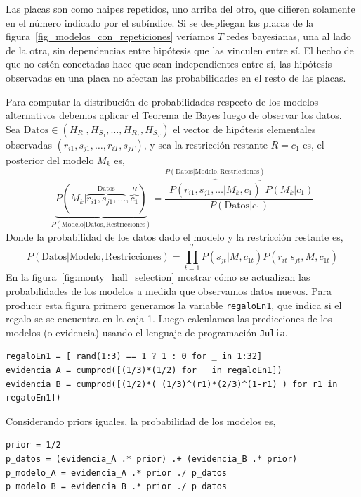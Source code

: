 \documentclass[a4paper,11pt]{book}
\theoremstyle{definition}
\begin{document}
%
Las placas son como naipes repetidos, uno arriba del otro, que difieren solamente en el n\'umero indicado por el sub\'indice.
%
Si se despliegan las placas de la figura~\ref{fig_modelos_con_repeticiones} ver\'iamos $T$ redes bayesianas, una al lado de la otra, sin dependencias entre hip\'otesis que las vinculen entre s\'i.
%
El hecho de que no est\'en conectadas hace que sean independientes entre s\'i, las hip\'otesis observadas en una placa no afectan las probabilidades en el resto de las placas.


Para computar la distribuci\'on de probabilidades respecto de los modelos alternativos debemos aplicar el Teorema de Bayes luego de observar los datos.
%
Sea $\text{Datos}\in (H_{R_1}, H_{S_1}, \dots, H_{R_T}, H_{S_T})$ el vector de hip\'otesis elementales observadas $(r_{i1}, s_{j1}, \dots, r_{iT}, s_{jT})$, y sea la restricci\'on restante $R=c_1$ es, el posterior del modelo $M_k$ es,
%
\begin{equation}\label{eq:posterior_modelo_montyhall}
\underbrace{P(M_k|\overbrace{r_{i1},s_{j1}, \dots }^{\text{Datos}},\overbrace{c_1}^{R})}_{P(\text{Modelo}|\text{Datos},\text{Restricciones})} = \frac{\overbrace{P(r_{i1},s_{j1}, \dots |M_k,c_1)}^{P(\text{Datos}|\text{Modelo},\text{Restricciones})} P(M_k|c_1)}{P(\text{Datos}|c_1)}
\end{equation}
%
Donde la probabilidad de los datos dado el modelo y la restricci\'on restante es,
%
\begin{equation} \label{eq:evidencia_monty_hall}
P(\text{Datos}|\text{Modelo},\text{Restricciones}) = \prod_{t=1}^T P(s_{jt}|M,c_{1t})P(r_{it}|s_{jt},M,c_{1t})
\end{equation}
%
En la figura~\ref{fig:monty_hall_selection} mostrar c\'omo se actualizan las probabilidades de los modelos a medida que observamos datos nuevos.
%
Para producir esta figura primero generamos la variable \texttt{regaloEn1}, que indica si el regalo se se encuentra en la caja 1.
%
Luego calculamos las predicciones de los modelos (o evidencia) usando el lenguaje de programaci\'on \texttt{Julia}.
%
\begin{lstlisting}[backgroundcolor=\color{all}]
regaloEn1 = [ rand(1:3) == 1 ? 1 : 0 for _ in 1:32]
evidencia_A = cumprod([(1/3)*(1/2) for _ in regaloEn1])
evidencia_B = cumprod([(1/2)*( (1/3)^(r1)*(2/3)^(1-r1) ) for r1 in regaloEn1])
\end{lstlisting}
%
Considerando priors iguales, la probabilidad de los modelos es,
%
\begin{lstlisting}[backgroundcolor=\color{all}]
prior = 1/2
p_datos = (evidencia_A .* prior) .+ (evidencia_B .* prior)
p_modelo_A = evidencia_A .* prior ./ p_datos
p_modelo_B = evidencia_B .* prior ./ p_datos
\end{lstlisting}
\end{document}
